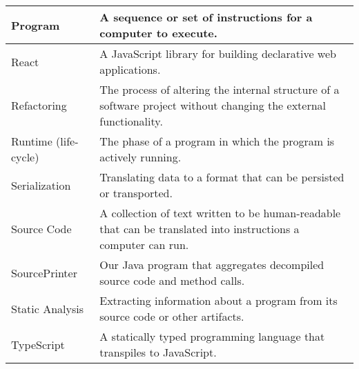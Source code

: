 \begin{tabularx}{\linewidth}{|l|X|}
\rowcolor[HTML]{CBCEFB} 
Program                     & A sequence or set of instructions for a computer to execute.                                                          \\ \hline
\rowcolor[HTML]{FFFFFF} 
React                       & A JavaScript library for building declarative web applications.                                                       \\ \hline
\rowcolor[HTML]{CBCEFB} 
Refactoring &
  The process of altering the internal structure of a software project without changing the external functionality. \\ \hline
\rowcolor[HTML]{FFFFFF} 
Runtime (life-cycle)        & The phase of a program in which the program is actively running.                                                      \\ \hline
\rowcolor[HTML]{CBCEFB} 
Serialization               & Translating data to a format that can be persisted or transported.                                                    \\ \hline
\rowcolor[HTML]{FFFFFF} 
Source Code                 & A collection of text written to be human-readable that can be translated into instructions a computer can run.        \\ \hline
\rowcolor[HTML]{CBCEFB} 
SourcePrinter               & Our Java program that aggregates decompiled source code and method calls.                                             \\ \hline
\rowcolor[HTML]{FFFFFF} 
Static Analysis             & Extracting information about a program from its source code or other artifacts.                                       \\ \hline
\rowcolor[HTML]{CBCEFB} 
TypeScript                  & A statically typed programming language that transpiles to JavaScript.                                                \\ \hline
\end{tabularx}
\newpage